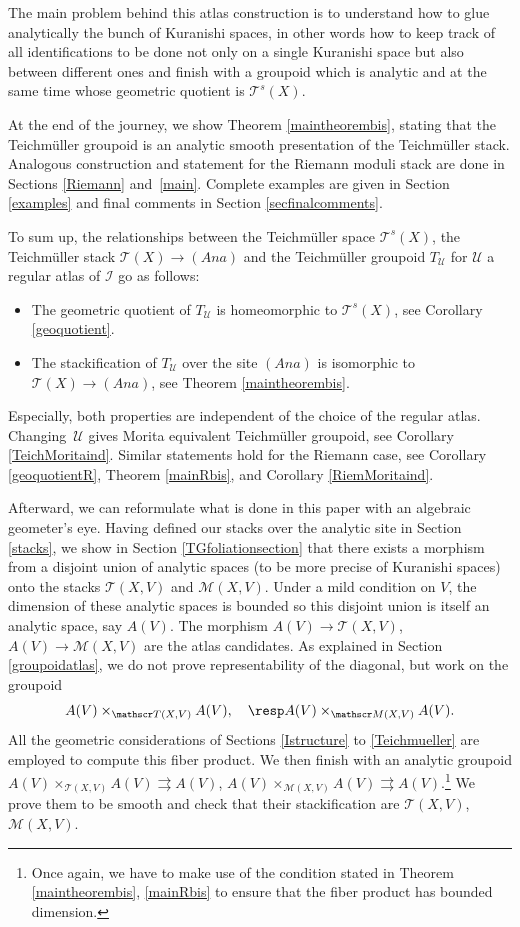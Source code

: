 \documentclass[10pt]{amsart}
\let\mathcal\mathscr
\newcommand{\Ana}{\mathit{Ana}}
\theoremstyle{plain}
\theoremstyle{definition}
\theoremstyle{remark}
\numberwithin{equation}{section}
\newcommand{\cI}{\mathcal{I}}
\begin{document}
The main problem behind this atlas construction is to understand how to glue analytically the bunch of Kuranishi spaces, in other words how to keep track of all identifications to be done not only on a single Kuranishi space but also between different ones and finish with a groupoid which is analytic and at the same time whose geometric quotient is $\mathcal T^s(X)$.

At the end of the journey, we show Theorem \ref{maintheorembis}, stating that the Teichmüller groupoid is an analytic smooth presentation of the Teichmüller stack. Analogous construction and statement for the Riemann moduli stack are done in Sections \ref{Riemann} and~\ref{main}. Complete examples are given in Section \ref{examples} and final comments in Section \ref{secfinalcomments}.

To sum up, the relationships between the Teichmüller space $\mathcal T^s(X)$, the Teichmüller stack $\mathcal T(X)\to (\Ana)$ and the Teichmüller groupoid $T_{\mathcal U}$ for $\mathcal U$ a regular atlas of $\cI$ go as follows:\vspace*{-3pt}
\begin{itemize}
\item The geometric quotient of $T_\mathcal U$ is homeomorphic to $\mathcal T^s(X)$, see Corollary \ref{geoquotient}.
\item The stackification of $T_\mathcal U$ over the site $(\Ana)$ is isomorphic to $\mathcal T(X)\to (\Ana)$, see Theorem \ref{maintheorembis}.
\end{itemize}
Especially, both properties are independent of the choice of the regular atlas. \hbox{Changing}~$\mathcal U$ gives Morita equivalent Teichmüller groupoid, see Corollary \ref{TeichMoritaind}. Similar statements hold for the Riemann case, see Corollary \ref{geoquotientR}, Theorem \ref{mainRbis}, and Corollary \ref{RiemMoritaind}.

Afterward, we can reformulate what is done in this paper with an algebraic geometer's eye. Having defined our stacks over the analytic site in Section \ref{stacks}, we show in Section \ref{TGfoliationsection} that there exists a morphism from a disjoint union of analytic spaces (to be more precise of Kuranishi spaces) onto the stacks $\mathcal T(X,V)$ and $\mathcal{M}(X,V)$. Under a mild condition on $V$, the dimension of these analytic spaces is bounded so this disjoint union is itself an analytic space, say $A(V)$. The morphism $A(V)\to \mathcal T(X,V)$, \resp $A(V)\to \mathcal M(X,V)$ are the atlas candidates. As explained in Section \ref{groupoidatlas}, we do not prove representability of the diagonal, but work on the groupoid
\[
A(V)\times_{\mathcal T(X,V)}A(V),\quad \resp A(V)\times_{\mathcal M(X,V)}A(V).
\]
All the geometric considerations of Sections \ref{Istructure} to \ref{Teichmueller} are employed to compute this fiber product. We then finish with an analytic groupoid $A(V)\times_{\mathcal T(X,V)}A(V)\rightrightarrows A(V)$, \resp $A(V)\times_{\mathcal M(X,V)}A(V)\rightrightarrows A(V)$.\footnote{Once again, we have to make use of the condition stated in Theorem \ref{maintheorembis}, \resp \ref{mainRbis} to ensure that the fiber product has bounded dimension.} We prove them to be smooth and check that their stackification are $\mathcal T(X,V)$, \resp $\mathcal M(X,V)$.
\end{document}
